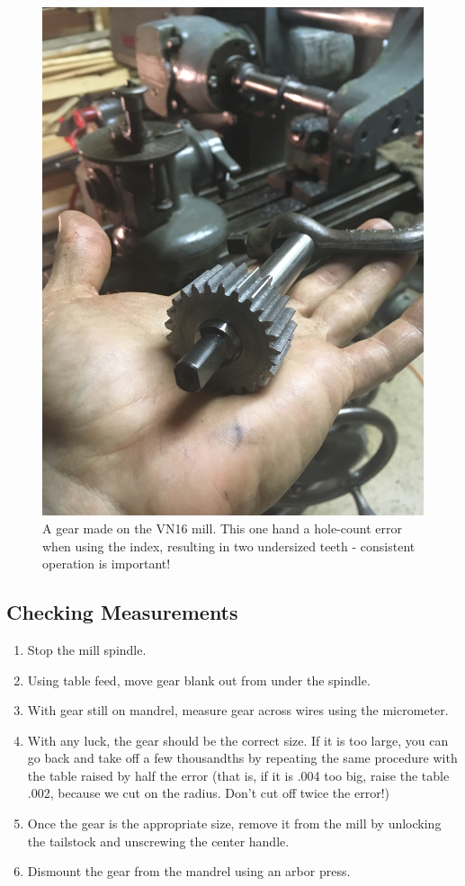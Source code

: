 \documentclass[12pt,twoside,letterpaper]{article}
\begin{document}
\begin{figure}[H]
	\centering
		\includegraphics[width=5in]{finalProduct}
	\caption{A gear made on the VN16 mill. This one hand a hole-count error when using the index, resulting in two undersized teeth - consistent operation is important!}
\end{figure}
\subsection{Checking Measurements}
\begin{enumerate}
\item Stop the mill spindle.
\item Using table feed, move gear blank out from under the spindle.
\item With gear still on mandrel, measure gear across wires using the micrometer.
\item With any luck, the gear should be the correct size. If it is too large, you can go back and take off a few thousandths by repeating the same procedure with the table raised by half the error (that is, if it is .004 too big, raise the table .002, because we cut on the radius. Don't cut off twice the error!) 
\item Once the gear is the appropriate size, remove it from the mill by unlocking the tailstock and unscrewing the center handle.
\item Dismount the gear from the mandrel using an arbor press. 
\end{enumerate}
\end{document}

